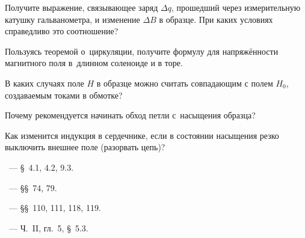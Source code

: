 \begin{lab:questions}

	\item Получите выражение, связывающее заряд $\Delta q$, прошедший через
    измерительную катушку гальванометра, и изменение $\Delta B$ в образце.
    При каких условиях справедливо это соотношение?

	\item Пользуясь теоремой о~циркуляции, получите формулу для напряжённости
магнитного поля в~длинном соленоиде и в торе.

    \item В каких случаях поле $H$ в образце можно считать совпадающим
    с полем $H_0$, создаваемым токами в обмотке?

    \item Почему рекомендуется начинать обход петли с~насыщения образца?

    \item Как изменится индукция в сердечнике, если в состоянии насыщения
    резко выключить внешнее поле (разорвать цепь)?
\end{lab:questions}


\begin{lab:literature}
    \item \Kirichenko~--- \S~4.1, 4.2, 9.3.

	\item \SivuhinIII~--- \S\S~74, 79.

	\item \Kalashnikov~--- \S\S~110, 111, 118, 119.

	\item \KingLokOlh~--- Ч.~II, гл.~5, \S~5.3.
    

\end{lab:literature}
